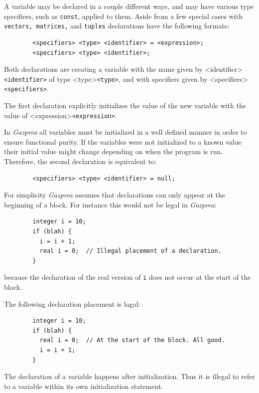 \documentclass{article}
\begin{document}
	A variable may be declared in a couple different ways, and may have various type specifiers, such as \texttt{const},
	applied to them. Aside from a few special cases with \texttt{vectors, matrices,} and \texttt{tuples} declarations
	have the following formats:

	\begin{lstlisting}
		<specifiers> <type> <identifier> = <expression>;
		<specifiers> <type> <identifier>;
	\end{lstlisting}

	Both declarations are creating a variable with the name given by <identifier>\texttt{<identifier>} of type
	<type>\texttt{<type>}, and with specifiers given by <specifiers>\texttt{<specifiers>}.

	The first declaration explicitly initializes the value of the new variable with the value of
	<expression>\texttt{<expression>}.

	In \textit{Gazprea} all variables must be initialized in a well defined manner in order to ensure functional purity.
	If the variables were not initialized to a known value their initial value might change depending on when the
	program is run.  Therefore, the second declaration is equivalent to:

	\begin{lstlisting}
		<specifiers> <type> <identifier> = null;
	\end{lstlisting}

	For simplicity \textit{Gazprea} assumes that declarations can only appear at the beginning of a block. For instance
	this would not be legal in \textit{Gazprea}:

	\begin{lstlisting}
		integer i = 10;
		if (blah) {
		  i = i + 1;
		  real i = 0;  // Illegal placement of a declaration.
		}
	\end{lstlisting}

	because the declaration of the real version of \texttt{i} does not occur at the start of the block.

	The following declaration placement is lagal:

	\begin{lstlisting}
		integer i = 10;
		if (blah) {
		  real i = 0;  // At the start of the block. All good.
		  i = i + 1;
		}
	\end{lstlisting}

	The declaration of a variable happens after initialization. Thus it is illegal to refer to a variable within its own
	initialization statement.
\end{document}
